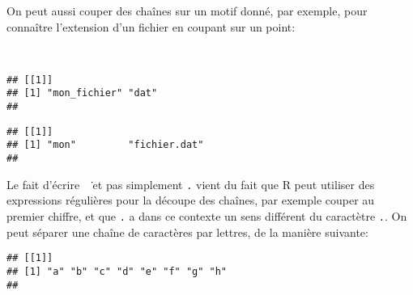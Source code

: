 \noindent On peut aussi couper des chaînes sur un motif donné, par exemple, pour connaître l'extension d'un fichier en coupant sur un point:

\begin{knitrout}
\color{fgcolor}\begin{kframe}
\begin{flushleft}
\ttfamily\noindent
{}\hlassignement{\usebox{\hlnormalsizeboxlessthan}-}{\ }\hspace*{\fill}\\
\hlstd{}\hlkeyword{(}\hlkeyword{,}{\ }\hlkeyword{)}\mbox{}
\normalfont
\end{flushleft}
\begin{verbatim}
## [[1]]
## [1] "mon_fichier" "dat"        
## 
\end{verbatim}
\begin{flushleft}
\ttfamily\noindent
{}\hlkeyword{(}\hlkeyword{,}{\ }\hlkeyword{)}\mbox{}
\normalfont
\end{flushleft}
\begin{verbatim}
## [[1]]
## [1] "mon"         "fichier.dat"
## 
\end{verbatim}
\end{kframe}
\end{knitrout}


\noident Le fait d'écrire \texttt{\ \.} et pas simplement \texttt{.} vient du fait que R peut utiliser des expressions régulières pour la découpe des chaînes,
par exemple couper au premier chiffre, et que \texttt{.} a dans ce contexte un sens différent du caractètre \texttt{.}.
On peut séparer une chaîne de caractères par lettres, de la manière suivante:

\begin{knitrout}
\color{fgcolor}\begin{kframe}
\begin{flushleft}
\ttfamily\noindent
{}\hlkeyword{(}\hlkeyword{,}{\ }\hlkeyword{)}\mbox{}
\normalfont
\end{flushleft}
\begin{verbatim}
## [[1]]
## [1] "a" "b" "c" "d" "e" "f" "g" "h"
## 
\end{verbatim}
\end{kframe}
\end{knitrout}


